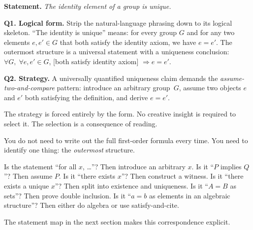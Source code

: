 \begin{example}
\textbf{Statement.} \emph{The identity element of a group is unique.}

\medskip
\noindent\textbf{Q1. Logical form.}
Strip the natural-language phrasing down to its logical skeleton.
``The identity is unique'' means: for every group $G$ and for any two
elements $e, e' \in G$ that both satisfy the identity axiom, we have
$e = e'$.
The outermost structure is a universal statement with a uniqueness
conclusion: $\forall G,\; \forall e, e' \in G$,
[both satisfy identity axiom] $\Rightarrow e = e'$.

\medskip
\noindent\textbf{Q2. Strategy.}
A universally quantified uniqueness claim demands the
\emph{assume-two-and-compare} pattern: introduce an arbitrary group~$G$,
assume two objects $e$ and $e'$ both satisfying the definition, and
derive $e = e'$.

The strategy is forced entirely by the form. No creative insight is
required to select it. The selection is a consequence of reading.
\end{example}

\begin{remark}
You do not need to write out the full first-order formula every time.
You need to identify one thing: the \emph{outermost} structure.

Is the statement ``for all $x$, \ldots''? Then introduce an arbitrary $x$.
Is it ``$P$ implies $Q$''? Then assume $P$.
Is it ``there exists $x$''? Then construct a witness.
Is it ``there exists a unique $x$''? Then split into existence and
uniqueness.
Is it ``$A = B$ as sets''? Then prove double inclusion.
Is it ``$a = b$ as elements in an algebraic structure''? Then either do
algebra or use satisfy-and-cite.

The statement map in the next section makes this correspondence explicit.
\end{remark}
